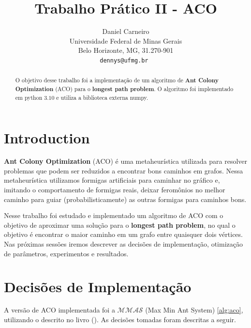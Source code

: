 \documentclass[10pt,twocolumn,letterpaper]{article}
\begin{document}
\title{Trabalho Prático II - ACO}

\author{Daniel Carneiro\\
Universidade Federal de Minas Gerais\\
Belo Horizonte, MG, 31.270-901\\
{\tt\small dennys@ufmg.br
}
}

\maketitle

\begin{abstract}
   O objetivo desse trabalho foi a implementação de um algoritmo de \textbf{Ant Colony Optimization} (ACO) para o \textbf{longest path problem}. O algoritmo foi implementado em python $3.10$ e utiliza a biblioteca externa numpy.
\end{abstract}

\section{Introduction}

\textbf{Ant Colony Optimization} (ACO) é uma metaheurística utilizada para resolver problemas que podem ser reduzidos a encontrar bons caminhos em grafos. Nessa metaheurística utilizamos formigas artificiais para caminhar no gráfico e, imitando o comportamento de formigas reais, deixar feromônios no melhor caminho para guiar (probabilisticamente) as outras formigas para caminhos bons.

Nesse trabalho foi estudado e implementado um algoritmo de ACO com o objetivo de aproximar uma solução para o \textbf{longest path problem}, no qual o objetivo é encontrar o maior caminho em um grafo entre quaisquer dois vértices. Nas próximas sessões iremos descrever as decisões de implementação, otimização de parâmetros, experimentos e resultados.

\section{Decisões de Implementação}

A versão de ACO implementada foi a $\mathcal{MMAS}$ (Max Min Ant System) \ref{alg:aco}, utilizando o descrito no livro  ()\cite{Dorigo2004}. As decisões tomadas foram descritas a seguir.
\end{document}
